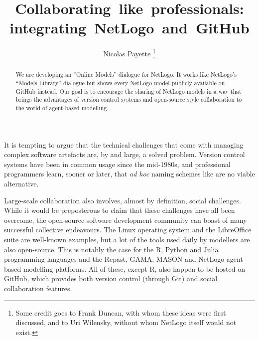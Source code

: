 \documentclass[runningheads]{llncs}
\begin{document}
%
\title{Collaborating~like~professionals: integrating~NetLogo~and~GitHub}

\author{Nicolas Payette%
  \thanks{Some credit goes to Frank Duncan, with whom these ideas were first discussed, and to Uri Wilensky, without whom NetLogo itself would not exist.}
}

%
\maketitle              %
%
\begin{abstract}
  We are developing an “Online Models” dialogue for NetLogo. It works like NetLogo's “Models Library” dialogue but shows every NetLogo model publicly available on GitHub instead. Our goal is to encourage the sharing of NetLogo models in a way that brings the advantages of version control systems and open-source style collaboration to the world of agent-based modelling.
\end{abstract}

It is tempting to argue that the technical challenges that come with managing complex software artefacts are, by and large, a solved problem. Version control systems have been in common usage since the mid-1980s, and professional programmers learn, sooner or later, that \emph{ad hoc} naming schemes like  are no viable alternative.

Large-scale collaboration also involves, almost by definition, social challenges. While it would be preposterous to claim that these challenges have all been overcome, the open-source software development community can boast of many successful collective endeavours. The Linux operating system and the LibreOffice suite are well-known examples, but a lot of the tools used daily by modellers are also open-source. This is notably the case for the R, Python and Julia programming languages and the Repast\cite{collier_repast:_2003}, GAMA\cite{taillandier_gama:_2010,grignard_gama_2013}, MASON \cite{luke_mason:_2003,luke_mason:_2004,luke_mason:_2005} and NetLogo \cite{wilensky_netlogo_1999,tisue_netlogo:_2004} agent-based modelling platforms. All of these, except R, also happen to be hosted on GitHub\cite{noauthor_github_nodate}, which provides both version control (through Git) and social collaboration features.
\end{document}

